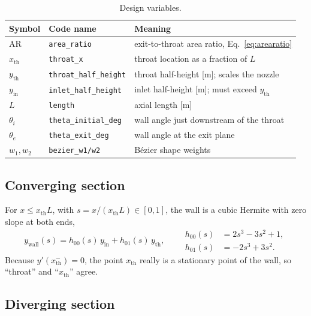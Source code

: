 \documentclass[11pt,a4paper]{article}
\newcommand{\code}[1]{\texttt{#1}}
\begin{document}
\begin{table}[H]
  \centering
  \small
  \begin{tabular}{llp{8.4cm}}
    \toprule
    Symbol & Code name & Meaning \\
    \midrule
    $\mathrm{AR}$          & \code{area\_ratio}         & exit-to-throat area ratio, Eq.~\eqref{eq:arearatio} \\
    $x_{\mathrm{th}}$      & \code{throat\_x}           & throat location as a fraction of $L$ \\
    $y_{\mathrm{th}}$      & \code{throat\_half\_height}& throat half-height [m]; scales the nozzle \\
    $y_{\mathrm{in}}$      & \code{inlet\_half\_height} & inlet half-height [m]; must exceed $y_{\mathrm{th}}$ \\
    $L$                    & \code{length}              & axial length [m] \\
    $\theta_i$             & \code{theta\_initial\_deg} & wall angle just downstream of the throat \\
    $\theta_e$             & \code{theta\_exit\_deg}    & wall angle at the exit plane \\
    $w_1, w_2$             & \code{bezier\_w1/w2}       & B\'ezier shape weights \\
    \bottomrule
  \end{tabular}
  \caption{Design variables.}
  \label{tab:design}
\end{table}

\subsection{Converging section}

For $x \le x_{\mathrm{th}} L$, with $s = x/(x_{\mathrm{th}} L) \in [0,1]$, the wall is
a cubic Hermite with zero slope at both ends,
\begin{equation}
  y_{\mathrm{wall}}(s) = h_{00}(s)\, y_{\mathrm{in}} + h_{01}(s)\, y_{\mathrm{th}},
  \qquad
  \begin{aligned}
    h_{00}(s) &= 2s^{3} - 3s^{2} + 1, \\
    h_{01}(s) &= -2s^{3} + 3s^{2}.
  \end{aligned}
  \label{eq:converging}
\end{equation}
Because $y'(x_{\mathrm{th}}^{-}) = 0$, the point $x_{\mathrm{th}}$ really is a
stationary point of the wall, so ``throat'' and ``$x_{\mathrm{th}}$'' agree.

\subsection{Diverging section}
\end{document}

